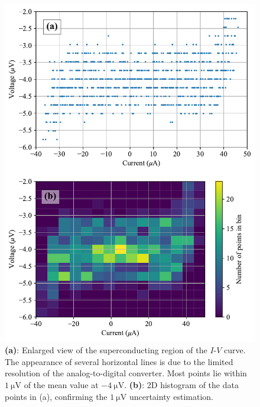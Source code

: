 \documentclass[twocol]{ametsocV6.1}
\begin{document}
\begin{figure}[ht]
	\centering
	\includegraphics[width=\linewidth]{../figures/V_uncertainties.pdf}
	\caption{
		\textbf{(a)}: Enlarged view of the superconducting region of the
		$I$-$V$ curve. The appearance of several horizontal lines is due to
		the limited resolution of the analog-to-digital converter.
		Most points lie within $\SI{1}{\micro\volt}$ of the mean value at
		$\SI{-4}{\micro\volt}$.
		\textbf{(b)}: 2D histogram of the data points in (a), confirming
		the $\SI{1}{\micro\volt}$ uncertainty estimation.
	}
	\label{fig:V_uncertainties}
\end{figure}
\end{document}
